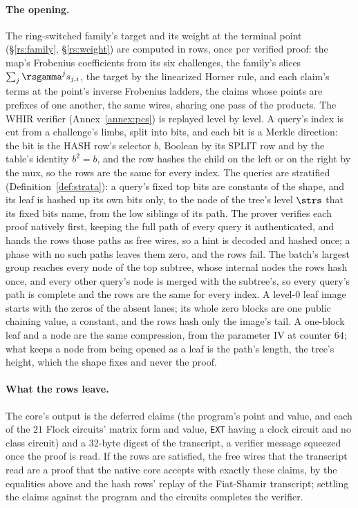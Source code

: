 \paragraph{The opening.} The ring-switched family's target and its weight at the terminal point (\S\ref{rs:family}, \S\ref{rs:weight}) are computed in rows, once per verified proof: the map's Frobenius coefficients from its six challenges, the family's slices $\sum_j\rsgamma^j s_{j,i}$, the target by the linearized Horner rule, and each claim's terms at the point's inverse Frobenius ladders, the claims whose points are prefixes of one another, the same wires, sharing one pass of the products. The WHIR verifier (Annex~\ref{annex:pcs}) is replayed level by level. A query's index is cut from a challenge's limbs, split into bits, and each bit is a Merkle direction: the bit is the \textsf{HASH} row's selector $b$, Boolean by its \textsf{SPLIT} row and by the table's identity $b^2=b$, and the row hashes the child on the left or on the right by the mux, so the rows are the same for every index. The queries are stratified (Definition~\ref{def:strata}): a query's fixed top bits are constants of the shape, and its leaf is hashed up its own bits only, to the node of the tree's level $\strs$ that its fixed bits name, from the low siblings of its path. The prover verifies each proof natively first, keeping the full path of every query it authenticated, and hands the rows those paths as free wires, so a hint is decoded and hashed once; a phase with no such paths leaves them zero, and the rows fail. The batch's largest group reaches every node of the top subtree, whose internal nodes the rows hash once, and every other query's node is merged with the subtree's, so every query's path is complete and the rows are the same for every index. A level-$0$ leaf image starts with the zeros of the absent lanes; its whole zero blocks are one public chaining value, a constant, and the rows hash only the image's tail. A one-block leaf and a node are the same compression, from the parameter IV at counter $64$; what keeps a node from being opened as a leaf is the path's length, the tree's height, which the shape fixes and never the proof.

\paragraph{What the rows leave.} The core's output is the deferred claims (the program's point and value, and each of the $21$ Flock circuits' matrix form and value, \texttt{EXT} having a clock circuit and no class circuit) and a 32-byte digest of the transcript, a verifier message squeezed once the proof is read. If the rows are satisfied, the free wires that the transcript read are a proof that the native core accepts with exactly these claims, by the equalities above and the hash rows' replay of the Fiat-Shamir transcript; settling the claims against the program and the circuits completes the verifier.

